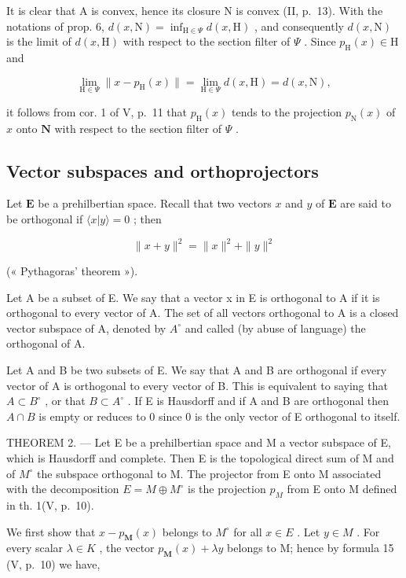 It is clear that A is convex, hence its closure N is convex (II, p.~13). With the notations of prop. 6, \(d(x, \mathrm{N}) = \inf_{\mathrm{H} \in \Psi} d(x, \mathrm{H})\) , and consequently \(d(x, \mathrm{N})\) is the limit of \(d(x, \mathrm{H})\) with respect to the section filter of \(\Psi\) . Since \(p_{\mathrm{H}}(x) \in \mathrm{H}\) and

\[
\lim _ {\mathrm{H} \in \Psi} \| x - p _ {\mathrm{H}} (x) \| = \lim _ {\mathrm{H} \in \Psi} d (x, \mathrm{H}) = d (x, \mathrm{N}),
\]

it follows from cor. 1 of V, p.~11 that \(p_{\mathrm{H}}(x)\) tends to the projection \(p_{\mathrm{N}}(x)\) of \(x\) onto \(\mathbf{N}\) with respect to the section filter of \(\Psi\) .

\subsection{Vector subspaces and orthoprojectors}

Let \(\mathbf{E}\) be a prehilbertian space. Recall that two vectors \(x\) and \(y\) of \(\mathbf{E}\) are said to be orthogonal if \(\langle x|y\rangle = 0\) ; then

\[
\| x + y \| ^ {2} = \| x \| ^ {2} + \| y \| ^ {2}\tag{16}
\]

(« Pythagoras' theorem »).

Let A be a subset of E. We say that a vector x in E is orthogonal to A if it is orthogonal to every vector of A. The set of all vectors orthogonal to A is a closed vector subspace of A, denoted by \(A^{\circ}\) and called (by abuse of language) the orthogonal of A.

Let A and B be two subsets of E. We say that A and B are orthogonal if every vector of A is orthogonal to every vector of B. This is equivalent to saying that \(A \subset B^{\circ}\) , or that \(B \subset A^{\circ}\) . If E is Hausdorff and if A and B are orthogonal then \(A \cap B\) is empty or reduces to 0 since 0 is the only vector of E orthogonal to itself.

THEOREM 2. --- Let E be a prehilbertian space and M a vector subspace of E, which is Hausdorff and complete. Then E is the topological direct sum of M and of \(M^{\circ}\) the subspace orthogonal to M. The projector from E onto M associated with the decomposition \(E = M \oplus M^{\circ}\) is the projection \(p_{M}\) from E onto M defined in th. 1(V, p.~10).

We first show that \(x - p_{\mathbf{M}}(x)\) belongs to \(M^{\circ}\) for all \(x \in E\) . Let \(y \in M\) . For every scalar \(\lambda \in K\) , the vector \(p_{\mathbf{M}}(x) + \lambda y\) belongs to M; hence by formula 15 (V, p.~10) we have,

